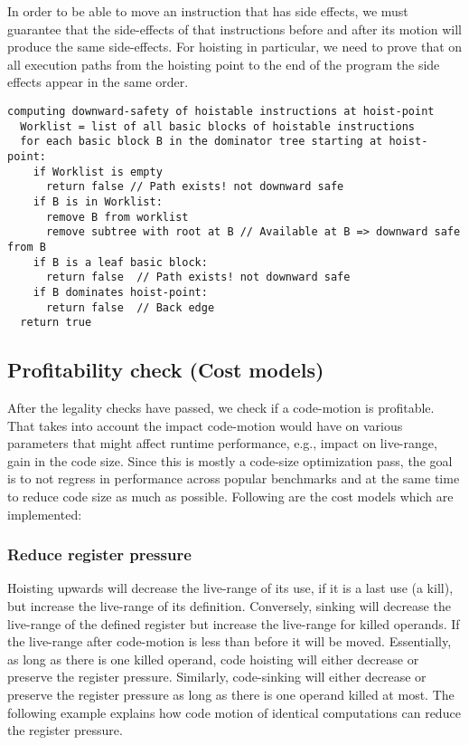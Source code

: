 \documentclass[acmlarge,review,anonymous]{acmart}\settopmatter{printfolios=true}
\begin{document}
In order to be able to move an instruction that has side effects, we must
guarantee that the side-effects of that instructions before and after its motion
will produce the same side-effects.  For hoisting in particular, we need to
prove that on all execution paths from the hoisting point to the end of the
program the side effects appear in the same order.

\begin{verbatim}
computing downward-safety of hoistable instructions at hoist-point
  Worklist = list of all basic blocks of hoistable instructions
  for each basic block B in the dominator tree starting at hoist-point:
    if Worklist is empty
      return false // Path exists! not downward safe
    if B is in Worklist:
      remove B from worklist
      remove subtree with root at B // Available at B => downward safe from B
    if B is a leaf basic block:
      return false  // Path exists! not downward safe
    if B dominates hoist-point:
      return false  // Back edge
  return true
\end{verbatim}

\subsection{Profitability check (Cost models)}
\label{subsec:cost-models}
After the legality checks have passed, we check if a code-motion is profitable.
That takes into account the impact code-motion would have on various parameters
that might affect runtime performance, e.g., impact on live-range, gain in the
code size. Since this is mostly a code-size optimization pass, the goal is to
not regress in performance across popular benchmarks and at the same time to reduce
code size as much as possible. Following are the cost models which are
implemented:

\subsubsection{Reduce register pressure}
\label{hoist:reg-pressure}
Hoisting upwards will decrease the live-range of its use, if it is a last use (a
kill), but increase the live-range of its definition. Conversely, sinking will
decrease the live-range of the defined register but increase the live-range for
killed operands. If the live-range after code-motion is less than before it will
be moved. Essentially, as long as there is one killed operand, code hoisting
will either decrease or preserve the register pressure.  Similarly, code-sinking
will either decrease or preserve the register pressure as long as there is one
operand killed at most.  The following example explains how code motion of
identical computations can reduce the register pressure.
\end{document}
